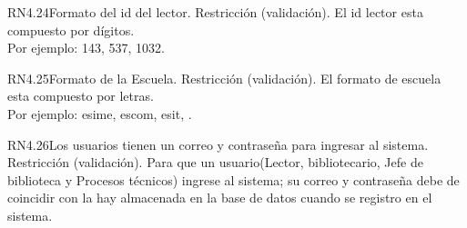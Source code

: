 
\begin{BussinesRule}{RN4.24}{Formato del id del lector.}
	\BRitem[Tipo:] Restricción (validación).
	\BRitem[Descripción:] El id lector esta compuesto por dígitos.\\
	Por ejemplo: 143, 537, 1032.\\
\end{BussinesRule}


\begin{BussinesRule}{RN4.25}{Formato de la Escuela.}
	\BRitem[Tipo:] Restricción (validación).
	\BRitem[Descripción:] El formato de escuela esta compuesto por letras.\\
	Por ejemplo: esime, escom, esit, .\\
\end{BussinesRule}


\begin{BussinesRule}{RN4.26}{Los usuarios tienen un correo y contraseña para ingresar al sistema.}
	\BRitem[Tipo:] Restricción (validación).
	\BRitem[Descripción:] Para que un usuario(Lector, bibliotecario, Jefe de biblioteca y Procesos técnicos) ingrese al sistema; su correo y contraseña debe de coincidir con la hay almacenada en la base de datos cuando se registro en el sistema.
\end{BussinesRule}




